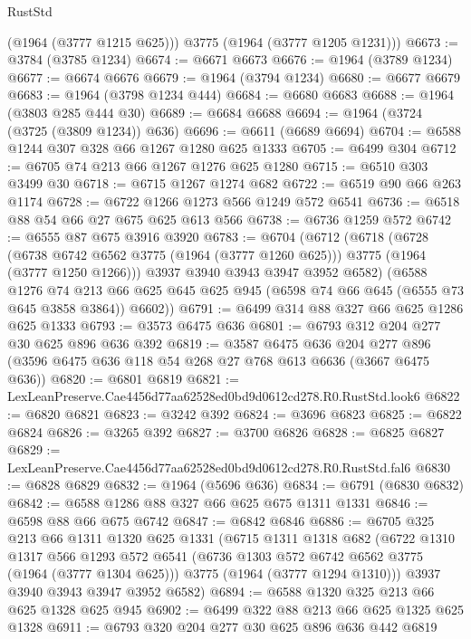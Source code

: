 \begin{lexlean}{RustStd}
\begin{coremodule}
        (@1964 (@3777 @1215 @625)))
      @3775
      (@1964 (@3777 @1205 @1231)))
@6673 := @3784 (@3785 @1234)
@6674 := @6671 @6673
@6676 := @1964 (@3789 @1234)
@6677 := @6674 @6676
@6679 := @1964 (@3794 @1234)
@6680 := @6677 @6679
@6683 := @1964 (@3798 @1234 @444)
@6684 := @6680 @6683
@6688 := @1964 (@3803 @285 @444 @30)
@6689 := @6684 @6688
@6694 := @1964 (@3724 (@3725 (@3809 @1234)) @636)
@6696 := @6611 (@6689 @6694)
@6704 := @6588 @1244 @307 @328 @66 @1267 @1280 @625 @1333
@6705 := @6499 @304
@6712 := @6705 @74 @213 @66 @1267 @1276 @625 @1280
@6715 := @6510 @303 @3499 @30
@6718 := @6715 @1267 @1274 @682
@6722 := @6519 @90 @66 @263 @1174
@6728 := @6722 @1266 @1273 @566 @1249 @572 @6541
@6736 := @6518 @88 @54 @66 @27 @675 @625 @613 @566
@6738 := @6736 @1259 @572
@6742 := @6555 @87 @675 @3916 @3920
@6783 := @6704
    (@6712
      (@6718
        (@6728
          (@6738 @6742 @6562 @3775 (@1964 (@3777 @1260 @625)))
          @3775
          (@1964 (@3777 @1250 @1266)))
        @3937
        @3940
        @3943
        @3947
        @3952
        @6582)
      (@6588
        @1276
        @74
        @213
        @66
        @625
        @645
        @625
        @945
        (@6598 @74 @66 @645 (@6555 @73 @645 @3858 @3864))
        @6602))
@6791 := @6499 @314 @88 @327 @66 @625 @1286 @625 @1333
@6793 := @3573 @6475 @636
@6801 := @6793 @312 @204 @277 @30 @625 @896 @636 @392
@6819 := @3587
    @6475
    @636
    @204
    @277
    @896
    (@3596 @6475 @636 @118 @54 @268 @27 @768 @613 @6636 (@3667 @6475 @636))
@6820 := @6801 @6819
@6821 := LexLeanPreserve.Cae4456d77aa62528ed0bd9d0612cd278.R0.RustStd.look6
@6822 := @6820 @6821
@6823 := @3242 @392
@6824 := @3696 @6823
@6825 := @6822 @6824
@6826 := @3265 @392
@6827 := @3700 @6826
@6828 := @6825 @6827
@6829 := LexLeanPreserve.Cae4456d77aa62528ed0bd9d0612cd278.R0.RustStd.fal6
@6830 := @6828 @6829
@6832 := @1964 (@5696 @636)
@6834 := @6791 (@6830 @6832)
@6842 := @6588 @1286 @88 @327 @66 @625 @675 @1311 @1331
@6846 := @6598 @88 @66 @675 @6742
@6847 := @6842 @6846
@6886 := @6705
    @325
    @213
    @66
    @1311
    @1320
    @625
    @1331
    (@6715
      @1311
      @1318
      @682
      (@6722
        @1310
        @1317
        @566
        @1293
        @572
        @6541
        (@6736 @1303 @572 @6742 @6562 @3775 (@1964 (@3777 @1304 @625)))
        @3775
        (@1964 (@3777 @1294 @1310)))
      @3937
      @3940
      @3943
      @3947
      @3952
      @6582)
@6894 := @6588 @1320 @325 @213 @66 @625 @1328 @625 @945
@6902 := @6499 @322 @88 @213 @66 @625 @1325 @625 @1328
@6911 := @6793 @320 @204 @277 @30 @625 @896 @636 @442 @6819

\end{coremodule}
\end{lexlean}
